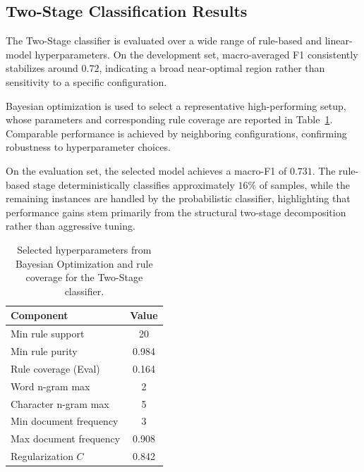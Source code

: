 \subsection{Two-Stage Classification Results}

The Two-Stage classifier is evaluated over a wide range of rule-based and
linear-model hyperparameters. On the development set, macro-averaged F1
consistently stabilizes around $0.72$, indicating a broad near-optimal region
rather than sensitivity to a specific configuration.

Bayesian optimization is used to select a representative high-performing
setup, whose parameters and corresponding rule coverage are reported in
Table~\ref{tab:two_stage_params}. Comparable performance is achieved by
neighboring configurations, confirming robustness to hyperparameter choices.

On the evaluation set, the selected model achieves a macro-F1 of $0.731$.
The rule-based stage deterministically classifies approximately $16\%$ of
samples, while the remaining instances are handled by the probabilistic
classifier, highlighting that performance gains stem primarily from the
structural two-stage decomposition rather than aggressive tuning.

\begin{table}[H]
\centering
\caption{Selected hyperparameters from Bayesian Optimization and rule coverage for the Two-Stage classifier.}
\label{tab:two_stage_params}
\begin{tabular}{lc}
\hline
\textbf{Component} & \textbf{Value} \\
\hline
Min rule support          & 20 \\
Min rule purity           & 0.984 \\
Rule coverage (Eval)      & 0.164 \\
\hline
Word n-gram max           & 2 \\
Character n-gram max      & 5 \\
Min document frequency    & 3 \\
Max document frequency    & 0.908 \\
Regularization $C$        & 0.842 \\
\hline
\end{tabular}
\end{table}

